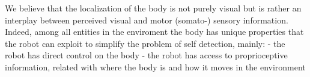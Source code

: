 \documentclass[conference]{IEEEtran}
\begin{document}
We believe that the localization of the body is not purely visual but is 
rather an interplay between perceived visual and motor (somato-) sensory information. 
Indeed, among all entities in the enviroment the body has unique properties 
that the robot can exploit to simplify the problem of self detection, mainly:
- the robot has direct control on the body
- the robot has access to proprioceptive information, related with where the body
is and how it moves in the environment

\end{document}
